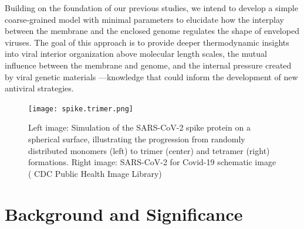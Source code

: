 \documentclass[12pt]{article}
\begin{document}
\begin{flushleft}
Building on the foundation of our previous studies, we intend to develop a simple coarse-grained model with minimal parameters to elucidate how the interplay between the membrane and the enclosed genome regulates the shape of enveloped viruses. The goal of this approach is to provide deeper thermodynamic insights into viral interior organization above molecular length scales, the mutual influence between the membrane and genome, and the internal pressure created by viral genetic materials —knowledge that could inform the development of new antiviral strategies.

\begin{figure}[!ht]
  \centering
  \texttt{[image: spike.trimer.png]}
  \caption{Left image: Simulation of the SARS-CoV-2 spike protein on a spherical surface, illustrating the progression from randomly distributed monomers (left) to trimer (center) and tetramer (right) formations. Right image: SARS-CoV-2 for Covid-19 schematic image ( CDC Public
Health Image Library) \cite{cdc-covid}}
\end{figure}

\vspace{-1em} 
\section*{Background and Significance}

\end{flushleft}
\end{document}
